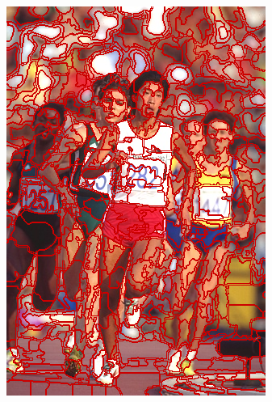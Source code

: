 \begin{figure}
{		\includegraphics[scale=\scalefivebsdtest]{pictures/bsd-test-8-oriseedsmp}
	}
	\subfigure{
}
\end{figure}
